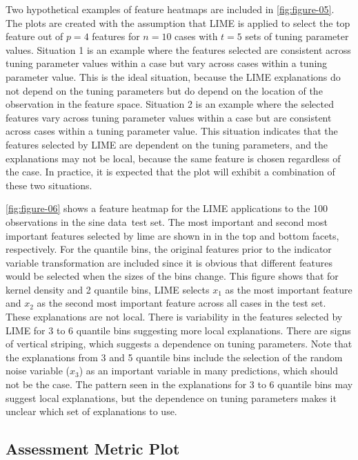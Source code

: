 \documentclass[AMS,STIX2COL]{WileyNJD-v2}\usepackage[]{graphicx}\usepackage[]{color}
\newcommand{\data}{sine data}
\begin{document}
Two hypothetical examples of feature heatmaps are included in \autoref{fig:figure-05}. The plots are created with the assumption that LIME is applied to select the top feature out of $p=4$  features for $n=10$ cases with $t=5$ sets of tuning parameter values. Situation 1 is  an example where the features selected are consistent across tuning parameter values within a case but vary across cases within a tuning parameter value. This is the ideal situation, because the LIME explanations do not depend on the tuning parameters but do depend on the location of the observation in the feature space. Situation 2 is an example where the selected features vary across tuning parameter values within a case but are consistent across cases within a tuning parameter value. This situation indicates that the features selected by LIME are dependent on the tuning parameters, and the explanations may not be  local, because the same feature is chosen regardless of the case. In practice, it is expected that the plot will exhibit a combination of these two situations.

\autoref{fig:figure-06} shows a feature heatmap for the LIME applications to the 100 observations in the \data \ test set. The most important and second most important features selected by lime are shown in in the top and bottom facets, respectively. For the quantile bins, the original features prior to the indicator variable transformation are included since it is obvious that different features would be selected when the sizes of the bins change. This figure shows that for kernel density and 2 quantile bins, LIME selects $x_1$ as the most important feature and $x_2$ as the second most important feature across all cases in the test set. These explanations are not local. There is variability in the features selected by LIME for 3 to 6 quantile bins suggesting more local explanations. There are signs of vertical striping, which suggests a dependence on tuning parameters. Note that the explanations from 3 and 5 quantile bins include the selection of the random noise variable ($x_3$) as an important variable in many predictions, which should not be the case. The pattern seen in the explanations for 3 to 6 quantile bins may suggest local explanations, but the dependence on tuning parameters makes it unclear which set of explanations to use.

\subsection{Assessment Metric Plot} \label{assess-metric}
\end{document}
